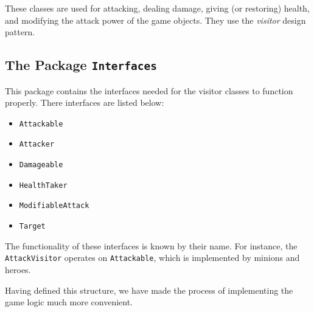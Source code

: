 \documentclass[a4paper]{article}
\begin{document}
These classes are used for attacking, dealing damage, giving (or restoring) health, and modifying the attack power of the game objects. They use the \textit{visitor} design pattern.

\subsection{The Package \texttt{Interfaces}}
This package contains the interfaces needed for the visitor classes to function properly. There interfaces are listed below:
\begin{itemize}
	\item \texttt{Attackable}
	\item \texttt{Attacker}
	\item \texttt{Damageable}
	\item \texttt{HealthTaker}
	\item \texttt{ModifiableAttack}
	\item \texttt{Target}
\end{itemize}
The functionality of these interfaces is known by their name. For instance, the \texttt{AttackVisitor} operates on \texttt{Attackable}, which is implemented by minions and heroes.

Having defined this structure, we have made the process of implementing the game logic much more convenient.
\end{document}
